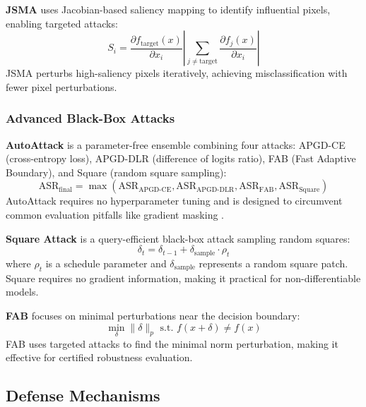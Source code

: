 \documentclass[10pt,conference]{IEEEtran}
\begin{document}
\textbf{JSMA} \cite{papernot2016limitations} uses Jacobian-based saliency mapping to identify influential pixels, enabling targeted attacks:
\begin{equation}
S_i = \frac{\partial f_{\text{target}}(x)}{\partial x_i} \left| \sum_{j \neq \text{target}} \frac{\partial f_j(x)}{\partial x_i} \right|
\end{equation}
JSMA perturbs high-saliency pixels iteratively, achieving misclassification with fewer pixel perturbations.

\subsubsection{Advanced Black-Box Attacks}

\textbf{AutoAttack} \cite{croce2020reliable} is a parameter-free ensemble combining four attacks: APGD-CE (cross-entropy loss), APGD-DLR (difference of logits ratio), FAB (Fast Adaptive Boundary), and Square (random square sampling):
\begin{equation}
\text{ASR}_{\text{final}} = \max(\text{ASR}_{\text{APGD-CE}}, \text{ASR}_{\text{APGD-DLR}}, \text{ASR}_{\text{FAB}}, \text{ASR}_{\text{Square}})
\end{equation}
AutoAttack requires no hyperparameter tuning and is designed to circumvent common evaluation pitfalls like gradient masking \cite{croce2020reliable}.

\textbf{Square Attack} \cite{andriushchenko2019square} is a query-efficient black-box attack sampling random squares:
\begin{equation}
\delta_t = \delta_{t-1} + \delta_{\text{sample}} \cdot \rho_t
\end{equation}
where $\rho_t$ is a schedule parameter and $\delta_{\text{sample}}$ represents a random square patch. Square requires no gradient information, making it practical for non-differentiable models.

\textbf{FAB} \cite{croce2019minimally} focuses on minimal perturbations near the decision boundary:
\begin{equation}
\min_\delta \|\delta\|_p \text{ s.t. } f(x+\delta) \neq f(x)
\end{equation}
FAB uses targeted attacks to find the minimal norm perturbation, making it effective for certified robustness evaluation.

\subsection{Defense Mechanisms}
\end{document}
